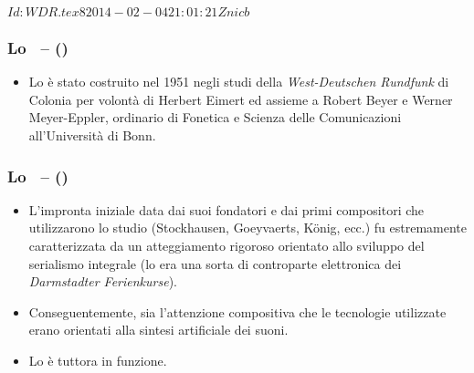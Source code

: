 
%
\svnInfo $Id: WDR.tex 8 2014-02-04 21:01:21Z nicb $

\setcounter{ms}{0}
\begin{frame}
    \frametitle{Lo \sem\ -- ()}

    \begin{itemize}

        \item Lo \sem \`e stato costruito nel 1951 negli studi della
            \emph{West-Deutschen Rundfunk} di Colonia per volont\`a
            di Herbert Eimert ed assieme a Robert Beyer e Werner Meyer-Eppler,
            ordinario di Fonetica e Scienza delle Comunicazioni all'Universit\`a di Bonn.

    \end{itemize}

\end{frame}

\begin{frame}
    \frametitle{Lo \sem\ -- ()}

    \begin{itemize}

        \item L'impronta iniziale data dai suoi fondatori e dai primi compositori
            che utilizzarono lo studio (Stockhausen, Goeyvaerts, K\"onig, ecc.)
            fu estremamente caratterizzata da un atteggiamento rigoroso
            orientato allo sviluppo del serialismo integrale (lo \sem era una sorta
            di controparte elettronica dei \emph{Darmstadter Ferienkurse}).

        \item Conseguentemente, sia l'attenzione compositiva che le tecnologie utilizzate
            erano orientati alla sintesi artificiale dei suoni.

        \item Lo \sem \`e tuttora in funzione.

    \end{itemize}

\end{frame}


